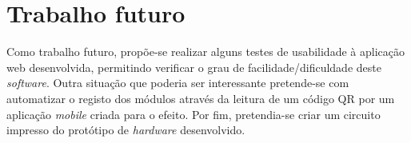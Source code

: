 



\section{Trabalho futuro}



Como trabalho futuro, propõe-se realizar alguns testes de usabilidade à aplicação web desenvolvida, permitindo verificar o grau de facilidade/dificuldade deste \textit{software}. Outra situação que poderia ser interessante pretende-se com automatizar o registo dos módulos através da leitura de um código \ac{QR} por um aplicação \textit{mobile} criada para o efeito. Por fim, pretendia-se criar um circuito impresso do protótipo de \textit{hardware} desenvolvido. 











 
